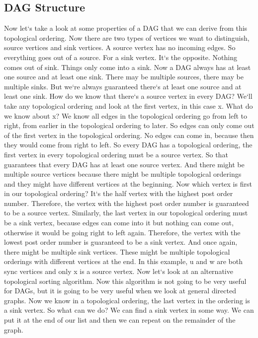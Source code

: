\subsection{DAG Structure}
Now let`s take a look at some properties of a DAG that we can derive from this topological ordering.
Now there are two types of vertices we want to distinguish, source vertices and sink vertices.
A source vertex has no incoming edges.
So everything goes out of a source.
For a sink vertex.
It`s the opposite.
Nothing comes out of sink.
Things only come into a sink.
Now a DAG always has at least one source and at least one sink.
There may be multiple sources, there may be multiple sinks.
But we`re always guaranteed there`s at least one source and at least one sink.
How do we know that there`s a source vertex in every DAG? We`ll take any topological ordering and look at the first vertex, in this case x.
What do we know about x? We know all edges in the topological ordering go from left to right, from earlier in the topological ordering to later.
So edges can only come out of the first vertex in the topological ordering.
No edges can come in, because then they would come from right to left.
So every DAG has a topological ordering, the first vertex in every topological ordering must be a source vertex.
So that guarantees that every DAG has at least one source vertex.
And there might be multiple source vertices because there might be multiple topological orderings and they might have different vertices at the beginning.
Now which vertex is first in our topological ordering? It`s the half vertex with the highest post order number.
Therefore, the vertex with the highest post order number is guaranteed to be a source vertex.
Similarly, the last vertex in our topological ordering must be a sink vertex, because edges can come into it but nothing can come out, otherwise it would be going right to left again.
Therefore, the vertex with the lowest post order number is guaranteed to be a sink vertex.
And once again, there might be multiple sink vertices.
These might be multiple topological orderings with different vertices at the end.
In this example, u and w are both sync vertices and only x is a source vertex.
Now let`s look at an alternative topological sorting algorithm.
Now this algorithm is not going to be very useful for DAGs, but it is going to be very useful when we look at general directed graphs.
Now we know in a topological ordering, the last vertex in the ordering is a sink vertex.
So what can we do? We can find a sink vertex in some way.
We can put it at the end of our list and then we can repeat on the remainder of the graph.
